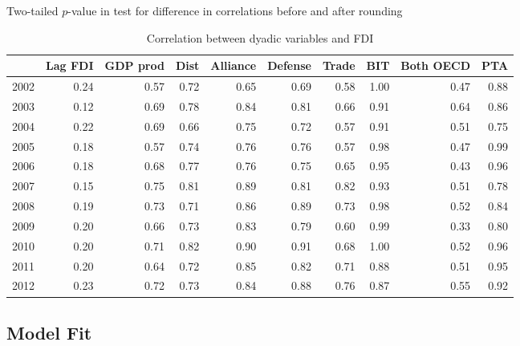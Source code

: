 \documentclass[reqno,onecolumn,letterpaper,12pt]{article}
\begin{document}
\begin{table}[!htp]
\centering
Two-tailed $p$-value in test for difference in correlations before and after rounding
\begin{tabular}{rrrrrrrrrr}
  \hline
 & Lag FDI & GDP prod & Dist & Alliance &Defense& Trade & BIT & Both OECD & PTA \\
  \hline
2002 & 0.24 & 0.57 & 0.72 & 0.65 & 0.69 & 0.58 & 1.00 & 0.47 & 0.88 \\
  2003 & 0.12 & 0.69 & 0.78 & 0.84 & 0.81 & 0.66 & 0.91 & 0.64 & 0.86 \\
  2004 & 0.22 & 0.69 & 0.66 & 0.75 & 0.72 & 0.57 & 0.91 & 0.51 & 0.75 \\
  2005 & 0.18 & 0.57 & 0.74 & 0.76 & 0.76 & 0.57 & 0.98 & 0.47 & 0.99 \\
  2006 & 0.18 & 0.68 & 0.77 & 0.76 & 0.75 & 0.65 & 0.95 & 0.43 & 0.96 \\
  2007 & 0.15 & 0.75 & 0.81 & 0.89 & 0.81 & 0.82 & 0.93 & 0.51 & 0.78 \\
  2008 & 0.19 & 0.73 & 0.71 & 0.86 & 0.89 & 0.73 & 0.98 & 0.52 & 0.84 \\
  2009 & 0.20 & 0.66 & 0.73 & 0.83 & 0.79 & 0.60 & 0.99 & 0.33 & 0.80 \\
  2010 & 0.20 & 0.71 & 0.82 & 0.90 & 0.91 & 0.68 & 1.00 & 0.52 & 0.96 \\
  2011 & 0.20 & 0.64 & 0.72 & 0.85 & 0.82 & 0.71 & 0.88 & 0.51 & 0.95 \\
  2012 & 0.23 & 0.72 & 0.73 & 0.84 & 0.88 & 0.76 & 0.87 & 0.55 & 0.92 \\
   \hline
\end{tabular}
\caption{Correlation between dyadic variables and FDI} \label{tab:cortest}
\end{table}

\subsection*{Model Fit}
\end{document}

